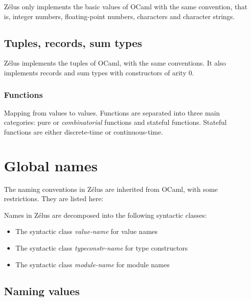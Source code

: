 \documentclass[11pt,titlepage,twoside]{report}
\newcommand{\zelus}{{\sf Z\'elus}}
\newcommand{\ocaml}{{\sf OCaml}}
\newcommand{\nterm}[1]{\textcolor{BrickRed}{\it #1}}
\newcommand{\nterm}[1]{{\em #1}}
\begin{document}
\zelus{} only implements the basic values of \ocaml{} with the same
convention, that is, integer numbers, floating-point numbers,
characters and character strings.

\subsection{Tuples, records, sum types\label{tuplesrecords}} %

\zelus{} implements the tuples of \ocaml, with the same conventions. It
also implements records and sum types with constructors of arity 0.

\subsubsection{Functions\label{funcvalues}} %
Mapping from values to values. Functions are separated into three main
categories: pure or \emph{combinatorial} functions and stateful functions. Stateful
functions are either discrete-time or continuous-time.

\section{Global names\label{global-names}} %

The naming conventions in \zelus{} are inherited from \ocaml, with some
restrictions. They are listed here:

Names in \zelus{} are decomposed into the following syntactic classes:
\begin{itemize}
\item
  The syntactic class \nterm{value-name} for value names
\item
  The syntactic class \nterm{typeconstr-name} for type constructors
\item
  The syntactic class \nterm{module-name} for module names
\end{itemize}

\subsection{Naming values\label{namingvalues}} %
\end{document}
